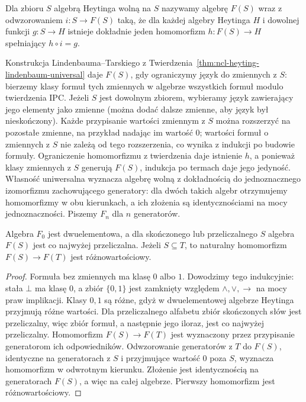 \begin{definicja}
\label{def:ncl-heyting-free}
Dla zbioru $S$ algebrą Heytinga wolną na $S$
nazywamy algebrę $F(S)$ wraz z odwzorowaniem
$i:S\to F(S)$ taką, że dla każdej algebry Heytinga
$H$ i dowolnej funkcji $g:S\to H$ istnieje dokładnie
jeden homomorfizm $h:F(S)\to H$ spełniający $h\circ i=g$.
\end{definicja}
Konstrukcja Lindenbauma--Tarskiego z
Twierdzenia~\ref{thm:ncl-heyting-lindenbaum-universal}
daje $F(S)$, gdy ograniczymy język do zmiennych z $S$:
bierzemy klasy formuł tych zmiennych w algebrze
wszystkich formuł modulo twierdzenia IPC.
Jeżeli $S$ jest dowolnym zbiorem, wybieramy język
zawierający jego elementy jako zmienne (można
dodać dalsze zmienne, aby język był nieskończony).
Każde przypisanie wartości zmiennym z $S$ można
rozszerzyć na pozostałe zmienne, na przykład
nadając im wartość $0$; wartości formuł o zmiennych
z $S$ nie zależą od tego rozszerzenia, co wynika
z indukcji po budowie formuły. Ograniczenie
homomorfizmu z twierdzenia daje istnienie $h$,
a ponieważ klasy zmiennych z $S$ generują $F(S)$,
indukcja po termach daje jego jedyność.
Własność uniwersalna wyznacza algebrę wolną
z dokładnością do jednoznacznego izomorfizmu
zachowującego generatory: dla dwóch takich algebr
otrzymujemy homomorfizmy w obu kierunkach,
a ich złożenia są identycznościami na mocy
jednoznaczności. Piszemy $F_n$ dla $n$ generatorów.

\begin{stwierdzenie}
\label{prop:ncl-heyting-free-size}
Algebra $F_0$ jest dwuelementowa, a dla skończonego
lub przeliczalnego $S$ algebra $F(S)$ jest
co najwyżej przeliczalna. Jeżeli $S\subseteq T$,
to naturalny homomorfizm $F(S)\to F(T)$
jest różnowartościowy.
\end{stwierdzenie}
\begin{proof}
Formuła bez zmiennych ma klasę $0$ albo $1$.
Dowodzimy tego indukcyjnie: stała $\bot$ ma klasę
$0$, a zbiór $\{0,1\}$ jest zamknięty względem
$\wedge,\vee,\to$ na mocy praw implikacji.
Klasy $0,1$ są różne, gdyż w dwuelementowej
algebrze Heytinga przyjmują różne wartości.
Dla przeliczalnego alfabetu zbiór skończonych
słów jest przeliczalny, więc zbiór formuł,
a następnie jego iloraz, jest co najwyżej
przeliczalny.
Homomorfizm $F(S)\to F(T)$ jest wyznaczony
przez przypisanie generatorom ich odpowiedników.
Odwzorowanie generatorów z $T$ do $F(S)$,
identyczne na generatorach z $S$ i przyjmujące
wartość $0$ poza $S$, wyznacza homomorfizm
w odwrotnym kierunku. Złożenie jest identycznością
na generatorach $F(S)$, a więc na całej algebrze.
Pierwszy homomorfizm jest różnowartościowy.
\end{proof}

